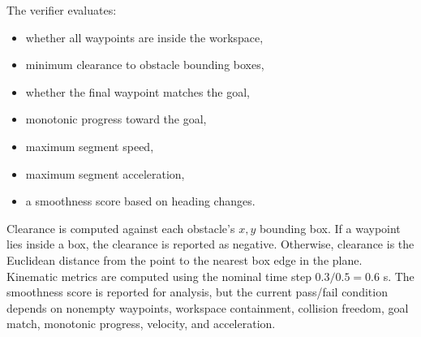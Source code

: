 \documentclass[11pt]{article}
\begin{document}
The verifier evaluates:

\begin{itemize}
  \item whether all waypoints are inside the workspace,
  \item minimum clearance to obstacle bounding boxes,
  \item whether the final waypoint matches the goal,
  \item monotonic progress toward the goal,
  \item maximum segment speed,
  \item maximum segment acceleration,
  \item a smoothness score based on heading changes.
\end{itemize}

Clearance is computed against each obstacle's \(x,y\) bounding box. If a waypoint lies inside a box, the clearance is reported as negative. Otherwise, clearance is the Euclidean distance from the point to the nearest box edge in the plane. Kinematic metrics are computed using the nominal time step \(0.3/0.5 = 0.6\) s. The smoothness score is reported for analysis, but the current pass/fail condition depends on nonempty waypoints, workspace containment, collision freedom, goal match, monotonic progress, velocity, and acceleration.

\begin{table}[H]
\centering
\caption{Dummy verification result table for report completion. Replace with measured logs when final experiments are available.}
\label{tab:verification-results}
\end{table}
\end{document}
